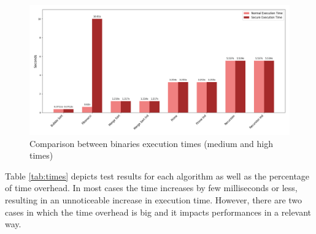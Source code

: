\begin{figure}[htbp]
  \centering
  \includegraphics[width=\linewidth]{images/high_times.png}
  \caption{Comparison between binaries execution times (medium and high times)}
  \label{fig:hightime}
\end{figure}

Table \ref{tab:times} depicts test results for each algorithm as well as the percentage
of time overhead. In most cases the time increases by few milliseconds or less, resulting
in an unnoticeable increase in execution time. However, there are two cases in which
the time overhead is big and it impacts performances in a relevant way.

